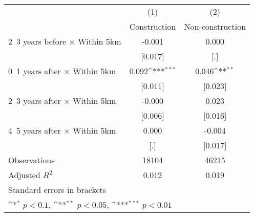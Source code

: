 {
\def\sym#1{\ifmmode^{#1}\else\(^{#1}\)\fi}
\begin{tabular}{l*{2}{c}}
\hline\hline
                    &\multicolumn{1}{c}{(1)}&\multicolumn{1}{c}{(2)}\\
                    &\multicolumn{1}{c}{Construction}&\multicolumn{1}{c}{Non-construction}\\
\hline
2~3 years before × Within 5km&      -0.001         &       0.000         \\
                    &     [0.017]         &         [.]         \\
0~1 years after × Within 5km&       0.092\sym{***}&       0.046\sym{**} \\
                    &     [0.011]         &     [0.023]         \\
2~3 years after × Within 5km&      -0.000         &       0.023         \\
                    &     [0.006]         &     [0.016]         \\
4~5 years after × Within 5km&       0.000         &      -0.004         \\
                    &         [.]         &     [0.017]         \\
\hline
Observations        &       18104         &       46215         \\
Adjusted \(R^{2}\)  &       0.012         &       0.019         \\
\hline\hline
\multicolumn{3}{l}{\footnotesize Standard errors in brackets}\\
\multicolumn{3}{l}{\footnotesize \sym{*} \(p<0.1\), \sym{**} \(p<0.05\), \sym{***} \(p<0.01\)}\\
\end{tabular}
}
